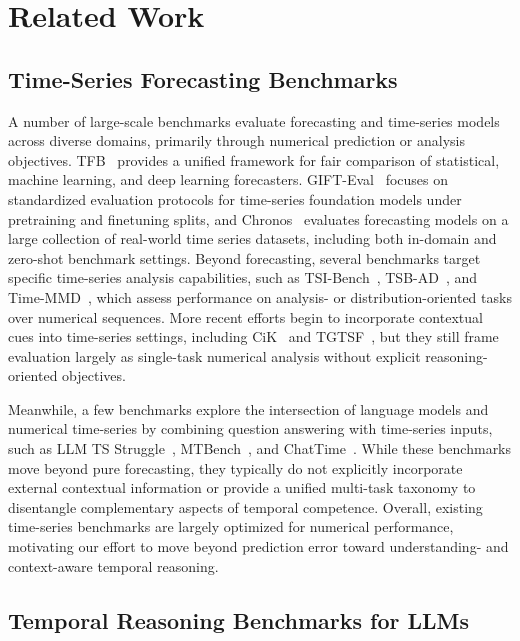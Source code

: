\section{Related Work}
\subsection{Time-Series Forecasting Benchmarks}

A number of large-scale benchmarks evaluate forecasting and time-series models across diverse domains, primarily through numerical prediction or analysis objectives.
TFB~\cite{qiu2024tfb} provides a unified framework for fair comparison of statistical, machine learning, and deep learning forecasters.
GIFT-Eval~\cite{aksu2024gifteval} focuses on standardized evaluation protocols for time-series foundation models under pretraining and finetuning splits, and Chronos~\cite{ansari2024chronos} evaluates forecasting models on a large collection of real-world time series datasets, including both in-domain and zero-shot benchmark settings.
Beyond forecasting, several benchmarks target specific time-series analysis capabilities, such as TSI-Bench~\cite{du2024tsi}, TSB-AD~\cite{liu2024elephant}, and Time-MMD~\cite{liu2024time}, which assess performance on analysis- or distribution-oriented tasks over numerical sequences.
More recent efforts begin to incorporate contextual cues into time-series settings, including CiK~\cite{williams2024context} and TGTSF~\cite{xu2024intervention}, but they still frame evaluation largely as single-task numerical analysis without explicit reasoning-oriented objectives.

Meanwhile, a few benchmarks explore the intersection of language models and numerical time-series by combining question answering with time-series inputs, such as LLM TS Struggle~\cite{merrill2024language}, MTBench~\cite{chen2025mtbench}, and ChatTime~\cite{wang2025chattime}.
While these benchmarks move beyond pure forecasting, they typically do not explicitly incorporate external contextual information or provide a unified multi-task taxonomy to disentangle complementary aspects of temporal competence.
Overall, existing time-series benchmarks are largely optimized for numerical performance, motivating our effort to move beyond prediction error toward understanding- and context-aware temporal reasoning.

\subsection{Temporal Reasoning Benchmarks for LLMs}

